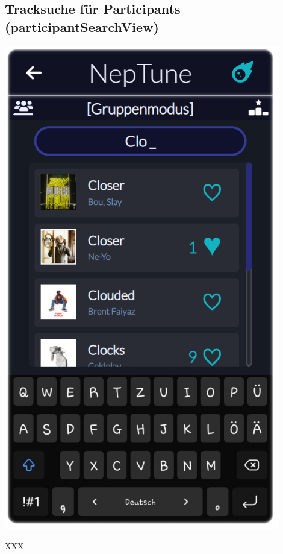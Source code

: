 \documentclass[oneside, ngerman]{sdqtechreport}
\begin{document}
\newpage

\subsection{Tracksuche für Participants (participantSearchView)}
\label{sec:Benutzeroberfläche:joinSessionView}


\begin{minipage}{0.5\textwidth}
    \hypertarget{participantSearchView}{}
    \includegraphics[width=0.9\textwidth]{LATEX/Pflichtenheft/GraphicDesigns/userSearchPage.png}
\end{minipage} 
\hfill
\begin{minipage}{0.5\textwidth}
    XXX
\end{minipage}
\end{document}
